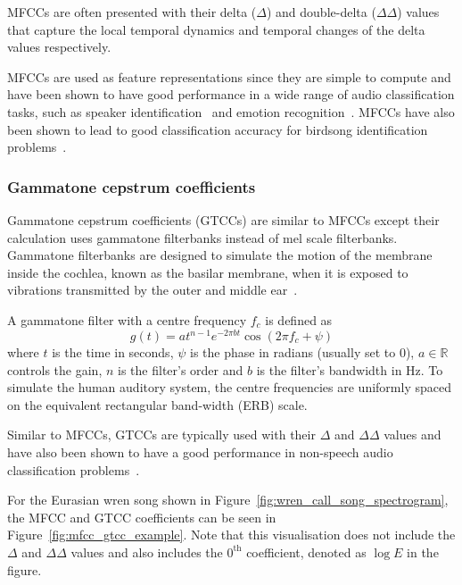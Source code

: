 MFCCs are often presented with their delta ($\Delta$) and double-delta
($\Delta\Delta$) values that capture the local temporal dynamics and temporal
changes of the delta values respectively.

MFCCs are used as feature representations since they are simple to compute and
have been shown to have good performance in a wide range of audio classification
tasks, such as speaker identification~\cite{muda2010voice} and emotion
recognition~\cite{likitha2017speech}. MFCCs have also been shown to lead to good
classification accuracy for birdsong identification
problems~\cite{fagerlund2007bird,ramashini2022robust}.

\subsubsection{Gammatone cepstrum coefficients}

Gammatone cepstrum coefficients (GTCCs) are similar to MFCCs except their
calculation  uses gammatone filterbanks instead of mel scale filterbanks.
Gammatone filterbanks are designed to simulate the motion of the membrane inside
the cochlea, known as the basilar membrane, when it is exposed to vibrations
transmitted by the outer and middle ear~\cite{patterson1992complex}.

A gammatone filter with a centre frequency $f_c$ is defined as
\begin{equation}
  g(t) = at^{n-1}e^{-2\pi b t} \cos(2\pi f_c + \psi)
\end{equation}
where $t$ is the time in seconds, $\psi$ is the phase in radians (usually set to
0), $a \in \mathbb{R}$ controls the gain, $n$ is the filter's order and $b$ is
the filter's bandwidth in Hz. To simulate the human auditory system, the centre
frequencies are uniformly spaced on the equivalent rectangular band-width (ERB)
scale.

Similar to MFCCs, GTCCs are typically used with their $\Delta$ and $\Delta\Delta$
values and have also been shown to have a good performance in
non-speech audio classification problems~\cite{valero2012gammatone}.

For the Eurasian wren song shown in Figure~\ref{fig:wren_call_song_spectrogram},
the MFCC and GTCC coefficients can be seen in
Figure~\ref{fig:mfcc_gtcc_example}. Note that this visualisation does not
include the $\Delta$ and $\Delta\Delta$ values and also includes the
$0^{\text{th}}$ coefficient, denoted as $\log E$ in the figure.

